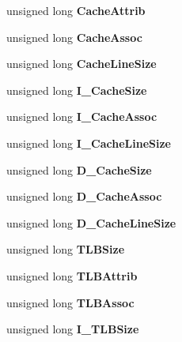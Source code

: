 \begin{DoxyCompactItemize}
unsigned long {\bfseries Cache\+Attrib}
\item 
\mbox{\label{struct__VPD_af06f66a6efe36e670cee24386c79850a}} 
unsigned long {\bfseries Cache\+Assoc}
\item 
\mbox{\label{struct__VPD_ac4852b3805c12f7a61f3049e6876d9f0}} 
unsigned long {\bfseries Cache\+Line\+Size}
\item 
\mbox{\label{struct__VPD_adcdbf3275af1ebe17736d1f6c39f65d5}} 
unsigned long {\bfseries I\+\_\+\+Cache\+Size}
\item 
\mbox{\label{struct__VPD_ae9f839a94e2d73af93ec05f5d5044f78}} 
unsigned long {\bfseries I\+\_\+\+Cache\+Assoc}
\item 
\mbox{\label{struct__VPD_a347a28609b500ea5908642b28b5a2e7c}} 
unsigned long {\bfseries I\+\_\+\+Cache\+Line\+Size}
\item 
\mbox{\label{struct__VPD_a5c70cbb2bf8c109baed7b71f3ae0992d}} 
unsigned long {\bfseries D\+\_\+\+Cache\+Size}
\item 
\mbox{\label{struct__VPD_a4e26dd378f107858b888c375d3470b53}} 
unsigned long {\bfseries D\+\_\+\+Cache\+Assoc}
\item 
\mbox{\label{struct__VPD_a85af98c6c85a830b5741866c7fe5608c}} 
unsigned long {\bfseries D\+\_\+\+Cache\+Line\+Size}
\item 
\mbox{\label{struct__VPD_a9a7347e6064be7a9dd892a595a8875fe}} 
unsigned long {\bfseries T\+L\+B\+Size}
\item 
\mbox{\label{struct__VPD_a0b14d0cb117e19322348207ef6e2ccc2}} 
unsigned long {\bfseries T\+L\+B\+Attrib}
\item 
\mbox{\label{struct__VPD_a1e0630fec5bcf00ee0ef08ae205c8b42}} 
unsigned long {\bfseries T\+L\+B\+Assoc}
\item 
\mbox{\label{struct__VPD_a9c1591cb9c758be24c3210306c66a7f1}} 
unsigned long {\bfseries I\+\_\+\+T\+L\+B\+Size}

\end{DoxyCompactItemize}
